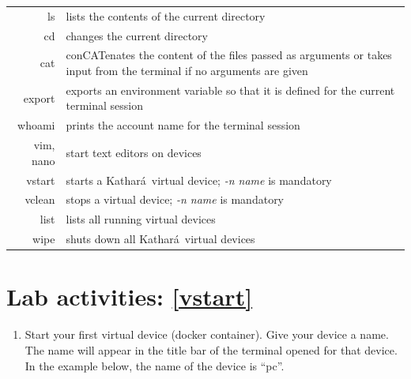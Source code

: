 \documentclass[12pt]{book}
\newcommand{\kathara}{Kathar\'a}
\begin{document}
\begin{enumerate}[label=\arabic*.]
\begin{tabularx}{\textwidth}{r  X}
  ls & lists the contents of the current directory \\
  cd & changes the current directory \\
  cat & conCATenates the content of the files passed as arguments or takes input from the terminal if no arguments are given \\
  export & exports an environment variable so that it is defined for the current terminal session \\
  whoami & prints the account name for the terminal session\\
  vim, nano & start text editors on devices \\ \midrule
  vstart & starts a \kathara\ virtual device; \emph{-n name} is mandatory \\
  vclean & stops a virtual device;  \emph{-n name} is mandatory \\
  list & lists all running virtual devices \\
  wipe & shuts down all \kathara\ virtual devices\\
\end{tabularx}



\section{Lab activities: \ref{vstart}}

\begin{enumerate}[label=Activity \arabic*:]
    

  
\item Start your first virtual device (docker container). Give your device a name. The name will appear in the title bar of the terminal opened for that device. In the example below, the name of the device is ``pc''.


\end{enumerate}
\end{enumerate}
\end{document}
